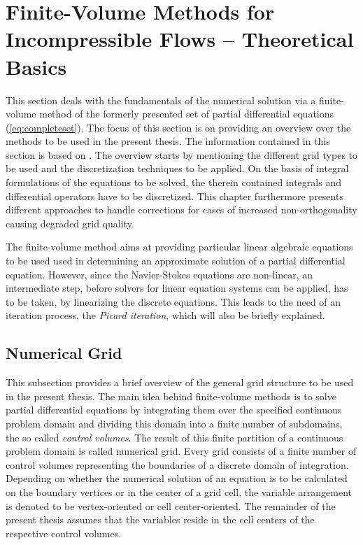 \section{Finite-Volume Methods for Incompressible Flows -- Theoretical Basics}
\label{sec:fvm}

This section deals with the fundamentals of the numerical solution via a finite-volume method of the formerly presented set of partial differential equations (\ref{eq:completeset}). The focus of this section is on providing an overview over the methods to be used in the present thesis. The information contained in this section is based on \cite{ferziger02,jasak96,schaefer99,muzaferja}. The overview starts by mentioning the different grid types to be used and the discretization techniques to be applied. On the basis of integral formulations of the equations to be solved, the therein contained integrals and differential operators have to be discretized. This chapter furthermore presents different approaches to handle corrections for cases of increased non-orthogonality causing degraded grid quality.
  
The finite-volume method aims at providing particular linear algebraic equations to be used used in determining an approximate solution of a partial differential equation. However, since the Navier-Stokes equations are non-linear, an intermediate step, before solvers for linear equation systems can be applied, has to be taken, by linearizing the discrete equations. This leads to the need of an iteration process, the \emph{Picard iteration}, which will also be briefly explained. 
      
\subsection{Numerical Grid}

This subsection provides a brief overview of the general grid structure to be used in the present thesis. The main idea behind finite-volume methods is to solve partial differential equations by integrating them over the specified continuous problem domain and dividing this domain into a finite number of subdomains, the so called \emph{control volumes}. The result of this finite partition of a continuous problem domain is called numerical grid. Every grid consists of a finite number of control volumes representing the boundaries of a discrete domain of integration. Depending on whether the numerical solution of an equation is to be calculated on the boundary vertices or in the center of a grid cell, the variable arrangement is denoted to be vertex-oriented or cell center-oriented. The remainder of the present thesis assumes that the variables reside in the cell centers of the respective control volumes.

